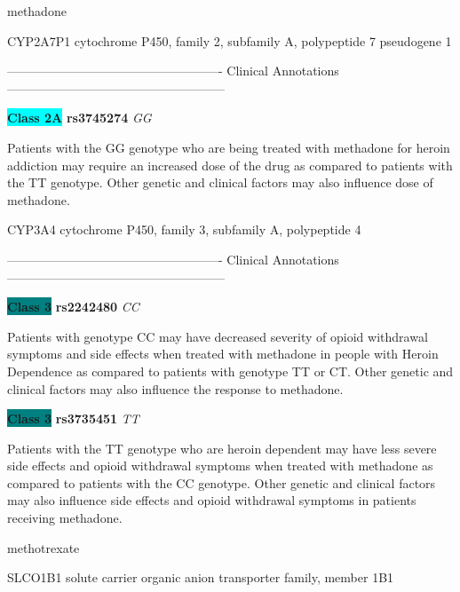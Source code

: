 \documentclass{resume} %
\begin{document}
\begin{rSection}{ methadone }
\begin{rSubsection}{ CYP2A7P1 }{ cytochrome P450, family 2, subfamily A, polypeptide 7 pseudogene 1 }{}{}
\item[] ---------------------------------------------------- Clinical Annotations -----------------------------------------------------\newline
\item \textbf{\colorbox{cyan} {Class 2A}} \textbf{ rs3745274 } \textit{ GG }
\item[] Patients with the GG genotype who are being treated with methadone for heroin addiction may require an increased dose of the drug as compared to patients with the TT genotype. Other genetic and clinical factors may also influence dose of methadone.
\end{rSubsection}\begin{rSubsection}{ CYP3A4 }{ cytochrome P450, family 3, subfamily A, polypeptide 4 }{}{}
\item[]

\item[] ---------------------------------------------------- Clinical Annotations -----------------------------------------------------\newline
\item \textbf{\colorbox{teal} {Class 3}} \textbf{ rs2242480 } \textit{ CC }
\item[] Patients with genotype CC may have decreased severity of opioid withdrawal symptoms and side effects when treated with methadone in people with Heroin Dependence as compared to patients with genotype TT or CT. Other genetic and clinical factors may also influence the response to methadone.\item \textbf{\colorbox{teal} {Class 3}} \textbf{ rs3735451 } \textit{ TT }
\item[] Patients with the TT genotype who are heroin dependent may have less severe side effects and opioid withdrawal symptoms when treated with methadone as compared to patients with the CC genotype. Other genetic and clinical factors may also influence side effects and opioid withdrawal symptoms in patients receiving methadone.
\end{rSubsection}

\end{rSection}\begin{rSection}{ methotrexate }
\item[]

\begin{rSubsection}{ SLCO1B1 }{ solute carrier organic anion transporter family, member 1B1 }{}{}
\item[]


\end{rSubsection}
\end{rSection}
\end{document}

